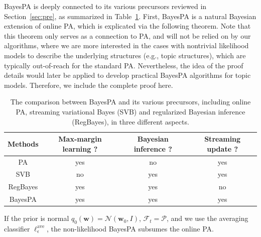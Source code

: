 \documentclass[twoside,11pt]{article}
\newcommand{\prob}{\mathcal{P}}
\begin{document}
BayesPA is deeply connected to its various precursors reviewed in Section~\ref{sec:pre}, as summarized in Table~\ref{table:relationship}. First, BayesPA is a natural Bayesian extension of online PA, which is explicated via the following theorem. Note that this theorem only serves as a connection to PA, and will not be relied on by our algorithms, where we are more interested in the cases with nontrivial likelihood models to describe the underlying structures (e.g., topic structures), which are typically out-of-reach for the standard PA. Nevertheless, the idea of the proof details would later be applied to develop practical BayesPA algorithms for topic models. Therefore, we include the complete proof here.

\begin{table}[t]
\centering
\begin{tabular}{
c|c|c|c}
\hline\hline
 \textbf{Methods} & Max-margin learning ? & Bayesian inference ? & Streaming update ? \\
\hline
PA & yes & no  &  yes  \\
SVB & no & yes  &  yes  \\
RegBayes & yes & yes & no \\
BayesPA & yes & yes & yes \\
\hline\hline
\end{tabular}
\caption{The comparison between BayesPA and its various precursors, including online PA, streaming variational Bayes (SVB) and regularized Bayesian inference (RegBayes), in three different aspects.}\label{table:relationship}\vspace{-0.3cm}
\end{table}

\begin{theorem} \label{tm:subsume}
If the prior is normal $q_0(\bm{w}) = \mathcal{N}(\bm{w}_0, I)$, $\mathcal{F}_t=\prob$, and we use the averaging classifier $\ell_\epsilon^\text{ave}$, the non-likelihood BayesPA subsumes the online PA.
\end{theorem}
\end{document}
